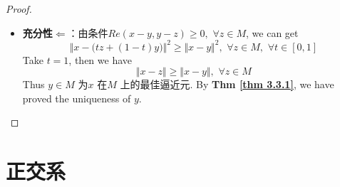 \begin{thm}
\begin{proof}
\begin{itemize}
				\vspace{4em}
				
				\item \textbf{充分性$\Leftarrow$}：由条件$Re(x - y , y - z) \geq 0 , \,\, \forall z \in M$, we can get
				\[ \Big\Vert x - \Big( tz + (1 - t)y \Big) \Big\Vert^2 \geq \Vert x - y \Vert^2 , \,\, \forall z \in M , \,\, \forall t \in [0 , 1] \]
				Take $t = 1$, then we have
				\[ \Vert x - z \Vert \geq \Vert x - y \Vert , \,\, \forall z \in M \]
				Thus $y \in M$ 为$x$ 在$M$ 上的最佳逼近元. By \textbf{Thm \ref{thm 3.3.1}}, we have proved the uniqueness of $y$. 
			\end{itemize}
		\end{proof}
	\end{thm}

\newpage

\section{正交系}
	
	
















	\ifx\allfiles\undefined

\fi